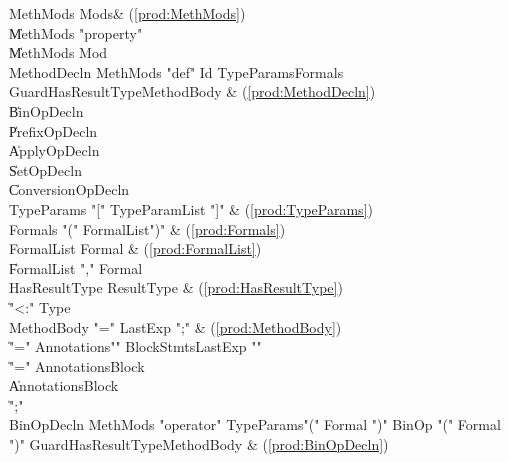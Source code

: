 \begin{bbgrammar}
            MethMods \: Mods\opt & (\ref{prod:MethMods}) \\
                     \| MethMods \xcd"property"  \\
                     \| MethMods Mod \\
         MethodDecln \: MethMods \xcd"def" Id TypeParams\opt Formals Guard\opt HasResultType\opt MethodBody & (\ref{prod:MethodDecln}) \\
                     \| BinOpDecln \\
                     \| PrefixOpDecln \\
                     \| ApplyOpDecln \\
                     \| SetOpDecln \\
                     \| ConversionOpDecln \\
          TypeParams \: \xcd"[" TypeParamList \xcd"]" & (\ref{prod:TypeParams}) \\
             Formals \: \xcd"(" FormalList\opt \xcd")" & (\ref{prod:Formals}) \\
          FormalList \: Formal & (\ref{prod:FormalList}) \\
                     \| FormalList \xcd"," Formal \\
       HasResultType \: ResultType & (\ref{prod:HasResultType}) \\
                     \| \xcd"<:" Type \\
          MethodBody \: \xcd"=" LastExp \xcd";" & (\ref{prod:MethodBody}) \\
                     \| \xcd"=" Annotations\opt \xcd"{" BlockStmts\opt LastExp \xcd"}" \\
                     \| \xcd"=" Annotations\opt Block \\
                     \| Annotations\opt Block \\
                     \| \xcd";" \\
          BinOpDecln \: MethMods \xcd"operator" TypeParams\opt \xcd"(" Formal  \xcd")" BinOp \xcd"(" Formal  \xcd")" Guard\opt HasResultType\opt MethodBody & (\ref{prod:BinOpDecln}) \\

\end{bbgrammar}
